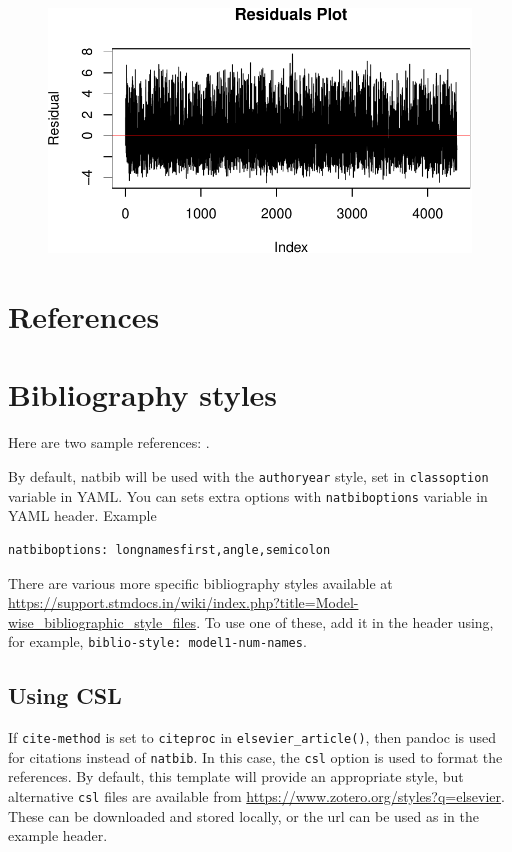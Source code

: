 \documentclass[
  super,
  preprint,
  3p]{elsarticle}
\begin{document}
\begin{figure}[H]

{\centering \includegraphics{project_report_files/figure-pdf/unnamed-chunk-40-1.pdf}

}

\end{figure}

\hypertarget{references}{%
\section*{References}\label{references}}

\hypertarget{bibliography-styles}{%
\section{Bibliography styles}\label{bibliography-styles}}

Here are two sample references: \citet{Feynman1963118}
\citet{Dirac1953888}.

By default, natbib will be used with the \texttt{authoryear} style, set
in \texttt{classoption} variable in YAML. You can sets extra options
with \texttt{natbiboptions} variable in YAML header. Example

\begin{verbatim}
natbiboptions: longnamesfirst,angle,semicolon
\end{verbatim}

There are various more specific bibliography styles available at
\url{https://support.stmdocs.in/wiki/index.php?title=Model-wise_bibliographic_style_files}.
To use one of these, add it in the header using, for example,
\texttt{biblio-style:\ model1-num-names}.

\hypertarget{using-csl}{%
\subsection{Using CSL}\label{using-csl}}

If \texttt{cite-method} is set to \texttt{citeproc} in
\texttt{elsevier\_article()}, then pandoc is used for citations instead
of \texttt{natbib}. In this case, the \texttt{csl} option is used to
format the references. By default, this template will provide an
appropriate style, but alternative \texttt{csl} files are available from
\url{https://www.zotero.org/styles?q=elsevier}. These can be downloaded
and stored locally, or the url can be used as in the example header.


  
\end{document}

